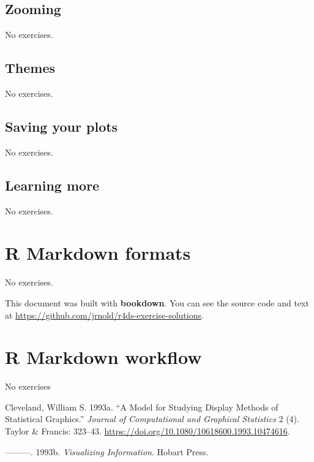 \documentclass[]{book}
\theoremstyle{plain}
\theoremstyle{remark}
\begin{document}
\hypertarget{zooming}{%
\section{Zooming}\label{zooming}}

No exercises.

\hypertarget{themes}{%
\section{Themes}\label{themes}}

No exercises.

\hypertarget{saving-your-plots}{%
\section{Saving your plots}\label{saving-your-plots}}

No exercises.

\hypertarget{learning-more-2}{%
\section{Learning more}\label{learning-more-2}}

No exercises.

\hypertarget{r-markdown-formats}{%
\chapter{R Markdown formats}\label{r-markdown-formats}}

No exercises.

This document was built with \textbf{bookdown}. You can see the source
code and text at
\url{https://github.com/jrnold/r4ds-exercise-solutions}.

\hypertarget{r-markdown-workflow}{%
\chapter{R Markdown workflow}\label{r-markdown-workflow}}

No exercises

\hypertarget{refs}{}
\leavevmode\hypertarget{ref-Cleveland1993a}{}%
Cleveland, William S. 1993a. ``A Model for Studying Display Methods of
Statistical Graphics.'' \emph{Journal of Computational and Graphical
Statistics} 2 (4). Taylor \& Francis: 323--43.
\url{https://doi.org/10.1080/10618600.1993.10474616}.

\leavevmode\hypertarget{ref-Cleveland1993}{}%
---------. 1993b. \emph{Visualizing Information}. Hobart Press.
\end{document}
